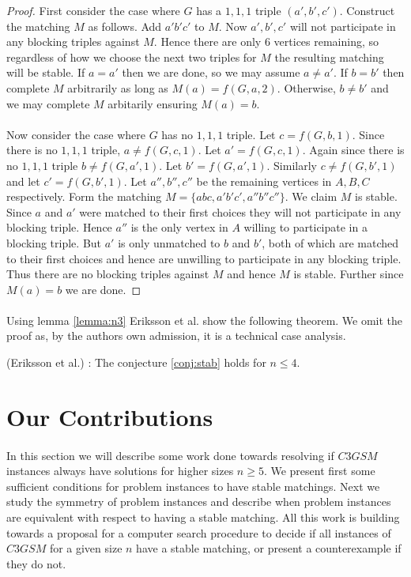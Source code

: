 \begin{proof} First consider the case where $G$ has a $1,1,1$ triple $(a',b',c')$. Construct the matching $M$ as follows. Add $a'b'c'$ to $M$. Now $a',b',c'$ will not participate in any blocking triples against $M$. Hence there are only $6$ vertices remaining, so regardless of how we choose the next two triples for $M$ the resulting matching will be stable. If $a = a'$ then we are done, so we may assume $a\neq a'$. If $b = b'$ then complete $M$ arbitrarily as long as $M(a) = f(G,a,2)$. Otherwise, $b\neq b'$ and we may complete $M$ arbitarily ensuring $M(a) = b$.
\paragraph{} Now consider the case where $G$ has no $1,1,1$ triple. Let $c = f(G,b,1)$. Since there is no $1,1,1$ triple, $a \neq f(G,c,1)$. Let $a' = f(G,c,1)$. Again since there is no $1,1,1$ triple $b \neq f(G,a',1)$. Let $b' = f(G,a',1)$. Similarly $c \neq f(G,b',1)$ and let $c' = f(G,b',1)$. Let $a'', b'', c''$ be the remaining vertices in $A,B,C$ respectively. Form the matching $M = \{abc,a'b'c',a''b''c''\}$. We claim $M$ is stable. Since $a$ and $a'$ were matched to their first choices they will not participate in any blocking triple. Hence $a''$ is the only vertex in $A$ willing to participate in a blocking triple. But $a'$ is only unmatched to $b$ and $b'$, both of which are matched to their first choices and hence are unwilling to participate in any blocking triple. Thus there are no blocking triples against $M$ and hence $M$ is stable. Further since $M(a) = b$ we are done. 
\end{proof}
\paragraph{}
Using lemma \ref{lemma:n3} Eriksson et al. show the following theorem. We omit the proof as, by the authors own admission, it is a technical case analysis.
\begin{theorem}(Eriksson et al.) \label{theorem:n4} \cite{eriksson2006three}: The conjecture \ref{conj:stab} holds for $n\leq 4$.
\end{theorem}
\section{Our Contributions}
\paragraph{}
In this section we will describe some work done towards resolving if $C3GSM$ instances always have solutions for higher sizes $n\geq 5$. We present first some sufficient conditions for problem instances to have stable matchings. Next we study the symmetry of problem instances and describe when problem instances are equivalent with respect to having a stable matching. All this work is building towards a proposal for a computer search procedure to decide if all instances of $C3GSM$ for a given size $n$ have a stable matching, or present a counterexample if they do not.

